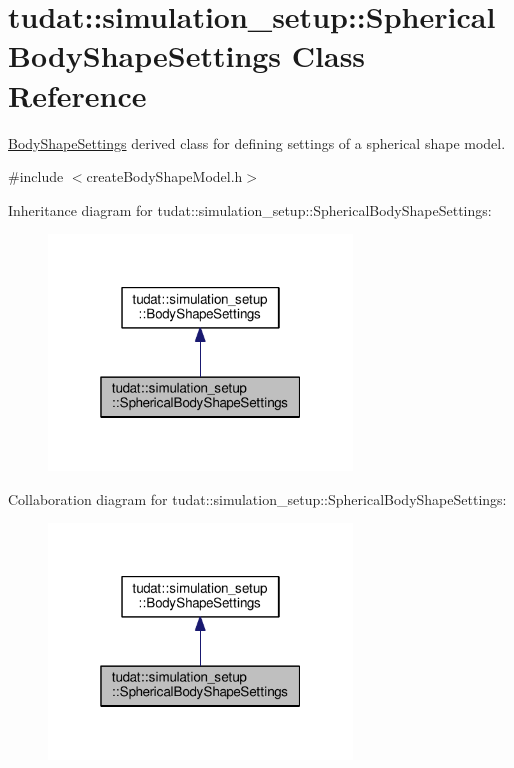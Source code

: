 \hypertarget{classtudat_1_1simulation__setup_1_1SphericalBodyShapeSettings}{}\section{tudat\+:\+:simulation\+\_\+setup\+:\+:Spherical\+Body\+Shape\+Settings Class Reference}
\label{classtudat_1_1simulation__setup_1_1SphericalBodyShapeSettings}


\hyperlink{classtudat_1_1simulation__setup_1_1BodyShapeSettings}{Body\+Shape\+Settings} derived class for defining settings of a spherical shape model.  




{\ttfamily \#include $<$create\+Body\+Shape\+Model.\+h$>$}



Inheritance diagram for tudat\+:\+:simulation\+\_\+setup\+:\+:Spherical\+Body\+Shape\+Settings\+:
\nopagebreak
\begin{figure}[H]
\begin{center}
\leavevmode
\includegraphics[width=229pt]{classtudat_1_1simulation__setup_1_1SphericalBodyShapeSettings__inherit__graph}
\end{center}
\end{figure}


Collaboration diagram for tudat\+:\+:simulation\+\_\+setup\+:\+:Spherical\+Body\+Shape\+Settings\+:
\nopagebreak
\begin{figure}[H]
\begin{center}
\leavevmode
\includegraphics[width=229pt]{classtudat_1_1simulation__setup_1_1SphericalBodyShapeSettings__coll__graph}
\end{center}
\end{figure}

